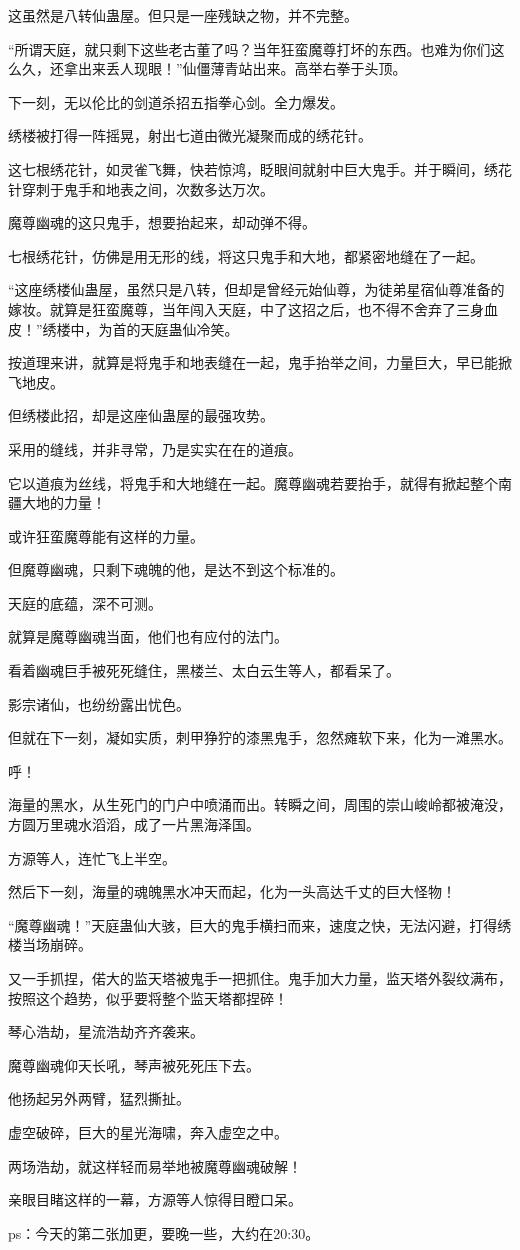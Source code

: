 \begin{this_body}
这虽然是八转仙蛊屋。但只是一座残缺之物，并不完整。

“所谓天庭，就只剩下这些老古董了吗？当年狂蛮魔尊打坏的东西。也难为你们这么久，还拿出来丢人现眼！”仙僵薄青站出来。高举右拳于头顶。

下一刻，无以伦比的剑道杀招五指拳心剑。全力爆发。

绣楼被打得一阵摇晃，射出七道由微光凝聚而成的绣花针。

这七根绣花针，如灵雀飞舞，快若惊鸿，眨眼间就射中巨大鬼手。并于瞬间，绣花针穿刺于鬼手和地表之间，次数多达万次。

魔尊幽魂的这只鬼手，想要抬起来，却动弹不得。

七根绣花针，仿佛是用无形的线，将这只鬼手和大地，都紧密地缝在了一起。

“这座绣楼仙蛊屋，虽然只是八转，但却是曾经元始仙尊，为徒弟星宿仙尊准备的嫁妆。就算是狂蛮魔尊，当年闯入天庭，中了这招之后，也不得不舍弃了三身血皮！”绣楼中，为首的天庭蛊仙冷笑。

按道理来讲，就算是将鬼手和地表缝在一起，鬼手抬举之间，力量巨大，早已能掀飞地皮。

但绣楼此招，却是这座仙蛊屋的最强攻势。

采用的缝线，并非寻常，乃是实实在在的道痕。

它以道痕为丝线，将鬼手和大地缝在一起。魔尊幽魂若要抬手，就得有掀起整个南疆大地的力量！

或许狂蛮魔尊能有这样的力量。

但魔尊幽魂，只剩下魂魄的他，是达不到这个标准的。

天庭的底蕴，深不可测。

就算是魔尊幽魂当面，他们也有应付的法门。

看着幽魂巨手被死死缝住，黑楼兰、太白云生等人，都看呆了。

影宗诸仙，也纷纷露出忧色。

但就在下一刻，凝如实质，刺甲狰狞的漆黑鬼手，忽然瘫软下来，化为一滩黑水。

呼！

海量的黑水，从生死门的门户中喷涌而出。转瞬之间，周围的崇山峻岭都被淹没，方圆万里魂水滔滔，成了一片黑海泽国。

方源等人，连忙飞上半空。

然后下一刻，海量的魂魄黑水冲天而起，化为一头高达千丈的巨大怪物！

“魔尊幽魂！”天庭蛊仙大骇，巨大的鬼手横扫而来，速度之快，无法闪避，打得绣楼当场崩碎。

又一手抓捏，偌大的监天塔被鬼手一把抓住。鬼手加大力量，监天塔外裂纹满布，按照这个趋势，似乎要将整个监天塔都捏碎！

琴心浩劫，星流浩劫齐齐袭来。

魔尊幽魂仰天长吼，琴声被死死压下去。

他扬起另外两臂，猛烈撕扯。

虚空破碎，巨大的星光海啸，奔入虚空之中。

两场浩劫，就这样轻而易举地被魔尊幽魂破解！

亲眼目睹这样的一幕，方源等人惊得目瞪口呆。

ps：今天的第二张加更，要晚一些，大约在20:30。

\end{this_body}

